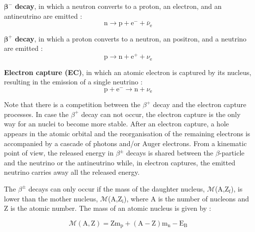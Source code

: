 \documentclass[main.tex]{subfiles}
\begin{document}
\bigskip


\NI $\boldsymbol{\beta^-}$ \textbf{decay}, in which a neutron converts to a proton, an electron, and an antineutrino are emitted :
\begin{equation}
\text{n} \rightarrow \text{p} + \text{e}^- + \bar{\nu}_\text{e}
\end{equation}


\bigskip


\NI $\boldsymbol{\beta^+}$ \textbf{decay}, in which a proton converts to a neutron, an positron, and a neutrino are emitted :
\begin{equation}
\text{p} \rightarrow \text{n} + \text{e}^+ + \nu_\text{e}
\end{equation} 


\bigskip 

 
\NI \textbf{Electron capture (EC)}, in which an atomic electron is captured by its nucleus, resulting in the emission of a single neutrino :
\begin{equation}
\text{p} + \text{e}^- \rightarrow \text{n} + \nu_{\text{e}}
\end{equation} 


\bigskip
 

\NI Note that there is a competition between the $\beta^+$ decay and the electron capture processes. In case the $\beta^+$ decay can not occur, the electron capture is the only way for an nuclei to become more stable. After an electron capture, a hole appears in the atomic orbital and the reorganisation of the remaining electrons is accompanied by a cascade of photons and/or Auger electrons. From a kinematic point of view, the released energy in $\beta^{\pm}$ decays is shared between the $\beta$-particle and the neutrino or the antineutrino while, in electron captures, the emitted neutrino carries away all the released energy. 


\bigskip


\NI The $\beta^{\pm}$ decays can only occur if the mass of the daughter nucleus, $\mathcal{M}$(A,Z$_\text{f}$), is lower than the mother nucleus, $\mathcal{M}$(A,Z$_\text{i}$), where A is the number of nucleons and Z is the atomic number. The mass of an atomic nucleus is given by : 


\begin{equation}\label{eq:Mass}
\mathcal{M} (\text{A},\text{Z}) = \text{Z} \text{m}_\text{p} + (\text{A}-\text{Z}) \text{m}_\text{n} - \text{E}_\text{B}
\end{equation}


\bigskip
\end{document}
